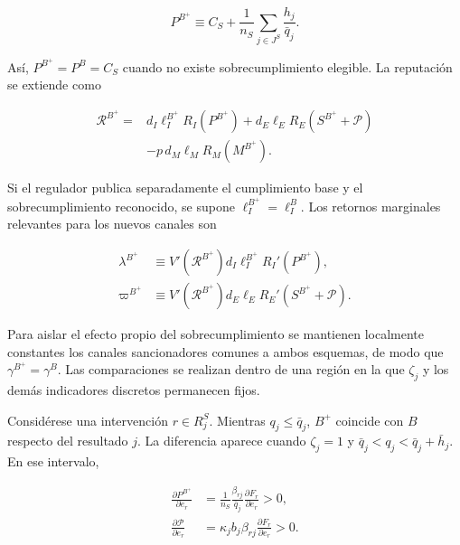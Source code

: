 \begin{equation}
\label{eq:desempeno_percibido_bplus}
P^{B^{+}}
\equiv
C_S
+
\frac{1}{n_S}
\sum_{j\in J^{S}}
\frac{h_j}{\bar q_j}.
\end{equation}

Así, \(P^{B^{+}}=P^B=C_S\) cuando no existe sobrecumplimiento elegible. La reputación se extiende como

\begin{equation}
\label{eq:reputacion_bplus}
\begin{aligned}
\mathcal R^{B^{+}}
={}&
d_I\ell_I^{B^{+}}
R_I\left(P^{B^{+}}\right)
+
d_E\ell_E
R_E\left(S^{B^{+}}+\mathcal P\right)
\\
&-
p\,d_M\ell_M
R_M\left(M^{B^{+}}\right).
\end{aligned}
\end{equation}

Si el regulador publica separadamente el cumplimiento base y el sobrecumplimiento reconocido, se supone \(\ell_I^{B^{+}}=\ell_I^{B}\). Los retornos marginales relevantes para los nuevos canales son

\begin{subequations}
\label{eq:retornos_marginales_bplus}
\begin{align}
\lambda^{B^{+}}
&\equiv
V'\!\left(\mathcal R^{B^{+}}\right)
d_I\ell_I^{B^{+}}
R_I'\!\left(P^{B^{+}}\right),
\\
\varpi^{B^{+}}
&\equiv
V'\!\left(\mathcal R^{B^{+}}\right)
d_E\ell_E
R_E'\!\left(S^{B^{+}}+\mathcal P\right).
\label{eq:varpi_bplus}
\end{align}
\end{subequations}

Para aislar el efecto propio del sobrecumplimiento se mantienen localmente constantes los canales sancionadores comunes a ambos esquemas, de modo que \(\gamma^{B^{+}}=\gamma^{B}\). Las comparaciones se realizan dentro de una región en la que \(\zeta_j\) y los demás indicadores discretos permanecen fijos.

Considérese una intervención \(r\in R_j^{S}\). Mientras \(q_j\leq\bar q_j\), \(B^{+}\) coincide con \(B\) respecto del resultado \(j\). La diferencia aparece cuando \(\zeta_j=1\) y \(\bar q_j<q_j<\bar q_j+\bar h_j\). En ese intervalo,

\begin{subequations}
\label{eq:derivadas_sobrecumplimiento_bplus}
\begin{align}
\frac{\partial P^{B^{+}}}{\partial e_r}
&=
\frac{1}{n_S}
\frac{\beta_{rj}}{\bar q_j}
\frac{\partial F_r}{\partial e_r}
>0,
\label{eq:derivada_p_bplus}
\\
\frac{\partial \mathcal P}{\partial e_r}
&=
\kappa_j b_j
\beta_{rj}
\frac{\partial F_r}{\partial e_r}
>0.
\label{eq:derivada_premio_bplus}
\end{align}
\end{subequations}


